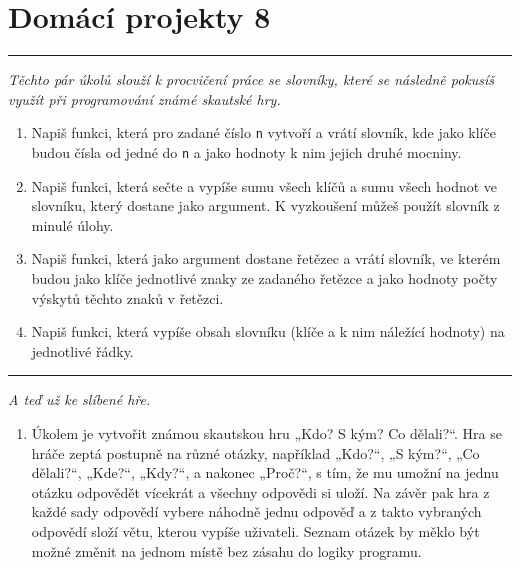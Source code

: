 \documentclass[a4paper,10pt]{article}
\newcommand\plsetno{8}
\newcommand\startsection[1]{
     \vspace{0.2ex}
    \hrule
    {\fontspec{Oxygen} \tiny
     \vspace{-1ex}
     \emph{#1}
     \vspace{-1.5em}
    }
}
\begin{document}
\section*{Domácí projekty \plsetno}

\startsection{Těchto pár úkolů slouží k procvičení práce se slovníky, které se
    následně pokusíš využít při programování známé skautské hry.}

\begin{enumerate}

\item Napiš funkci, která pro zadané číslo \texttt{n} vytvoří a vrátí slovník,
    kde jako klíče budou čísla od jedné do \texttt{n} a jako hodnoty k nim
    jejich druhé mocniny.

\item Napiš funkci, která sečte a vypíše sumu všech klíčů a sumu všech hodnot
    ve slovníku, který dostane jako argument. K vyzkoušení můžeš použít
    slovník z minulé úlohy.

\item Napiš funkci, která jako argument dostane řetězec a vrátí slovník,
    ve kterém budou jako klíče jednotlivé znaky ze zadaného řetězce a jako
    hodnoty počty výskytů těchto znaků v řetězci.

\item Napiš funkci, která vypíše obsah slovníku (klíče a k nim náležící
    hodnoty) na jednotlivé řádky.

\end{enumerate}

\startsection{A teď už ke slíbené hře.}

\begin{enumerate}[resume]

\item Úkolem je vytvořit známou skautskou hru „Kdo? S kým? Co dělali?“. Hra se
    hráče zeptá postupně na různé otázky, například „Kdo?“, „S kým?“,
    „Co dělali?“, „Kde?“, „Kdy?“, a nakonec „Proč?“, s tím, že mu umožní
    na jednu otázku odpovědět vícekrát a všechny odpovědi si uloží.
    Na závěr pak hra z každé sady odpovědí vybere náhodně jednu odpověď
    a z takto vybraných odpovědí složí větu, kterou vypíše uživateli.
    Seznam otázek by měklo být možné změnit na jednom místě bez zásahu
    do logiky programu.

\end{enumerate}
\end{document}
